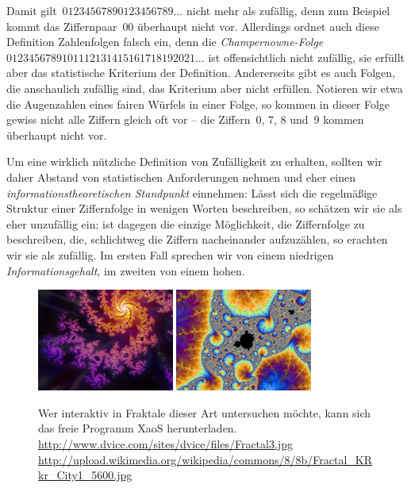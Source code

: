 \documentclass[twoside]{../zirkelblatt1415}
\theoremstyle{definition}
\theoremstyle{plain}
\theoremstyle{remark}
\begin{document}
Damit gilt~$01234567890123456789\ldots$ nicht mehr als zufällig, denn zum
Beispiel kommt das Ziffernpaar~$00$ überhaupt nicht vor. Allerdings ordnet auch
diese Definition Zahlenfolgen falsch ein, denn die \emph{Champernowne-Folge}
$0123456789101112131415161718192021\ldots$ ist offensichtlich nicht zufällig,
sie erfüllt aber das statistische Kriterium der Definition. Andererseits gibt
es auch Folgen, die anschaulich zufällig sind, das Kriterium aber nicht
erfüllen. Notieren wir etwa die Augenzahlen eines fairen Würfels in einer
Folge, so kommen in dieser Folge gewiss nicht alle Ziffern gleich oft vor --
die Ziffern~$0$, $7$, $8$ und~$9$ kommen überhaupt nicht vor.

Um eine wirklich nützliche Definition von Zufälligkeit zu erhalten, sollten wir
daher Abstand von statistischen Anforderungen nehmen und eher einen
\emph{informationstheoretischen Standpunkt} einnehmen: Lässt sich die
regelmäßige Struktur einer Ziffernfolge in wenigen Worten beschreiben, so
schätzen wir sie als eher unzufällig ein; ist dagegen die einzige Möglichkeit,
die Ziffernfolge zu beschreiben, die, schlichtweg die Ziffern nacheinander
aufzuzählen, so erachten wir sie als zufällig. Im ersten Fall sprechen wir von
einem niedrigen \emph{Informationsgehalt}, im zweiten von einem hohen.

\begin{figure}[b]
  \hfill
  \includegraphics[width=0.4\textwidth]{fraktal1}\hfill
  \includegraphics[width=0.4\textwidth]{fraktal2}\hfill
  \centering
  \caption{\label{fig:fraktale}Wer interaktiv in Fraktale dieser Art
  untersuchen möchte, kann sich das freie Programm XaoS herunterladen. \newline
  {\tiny
  \url{http://www.dvice.com/sites/dvice/files/Fractal3.jpg}
  \url{http://upload.wikimedia.org/wikipedia/commons/8/8b/Fractal_KRkr_City1_5600.jpg}}}
\end{figure}
\end{document}
